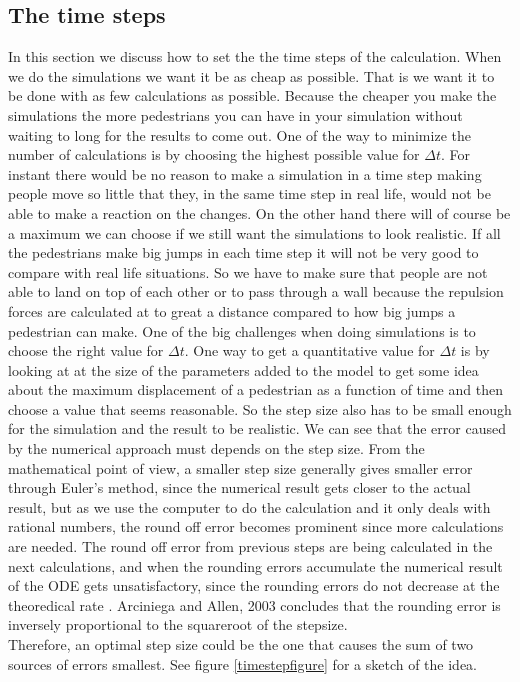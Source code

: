 \subsection{The time steps}
In this section we discuss how to set the the time steps of the calculation.
When we do the simulations we want it be as cheap as possible. That is we 
want it to be done with as few calculations as possible. Because the cheaper 
you make the simulations the more pedestrians you can have in your simulation 
without waiting to long for the results to come out. One of the way to minimize 
the number of calculations is by choosing the highest possible value for 
$\Delta t$. For instant there would be no reason to make a simulation in a 
time step making people move so little that they, in the same time step in 
real life, would not be able to make a reaction on the changes. On the other 
hand there will of course be a maximum we can choose if we still want the simulations to 
look realistic. If all the pedestrians make big jumps in each time step it will not be very 
good to compare with real life situations. So we have to make sure that people are not able 
to land on top of each other or to pass through a wall because the repulsion forces are 
calculated at to great a distance compared to how big jumps a pedestrian can make.
One of the big challenges when doing simulations is to choose the right value for $\Delta t$. 
One way to get a quantitative value for $\Delta t$ is by looking at at the size of the parameters 
added to the model to get some idea about the maximum displacement of a pedestrian as a function 
of time and then choose a value that seems reasonable.
So the step size also has to be small enough for the simulation and the result to be realistic.
We can see that the error caused by the numerical approach must depends on the step size.
From the mathematical point of view, a smaller step size generally gives smaller error through
Euler's method, since the numerical result gets closer to the actual result, but 
as we use the computer to do the calculation and it only deals with rational numbers, the 
round off error becomes prominent since more calculations are needed.
The round off error from previous steps are being calculated in the next calculations, and when the rounding errors accumulate  
the numerical result of the ODE gets unsatisfactory, since the rounding errors do not decrease at the theoredical rate \cite{RoundingError}.
Arciniega and Allen, 2003 concludes that the rounding error is inversely proportional to the squareroot of the stepsize.
\\
Therefore, an optimal step size could be the one that causes 
the sum of two sources of errors smallest. See figure \ref{timestepfigure} for a sketch of the
idea.



